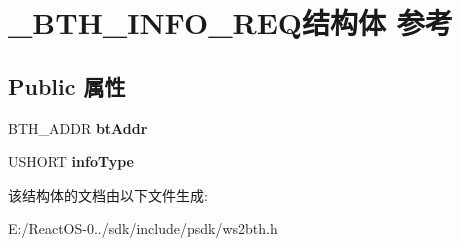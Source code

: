 \hypertarget{struct___b_t_h___i_n_f_o___r_e_q}{}\section{\+\_\+\+B\+T\+H\+\_\+\+I\+N\+F\+O\+\_\+\+R\+E\+Q结构体 参考}
\label{struct___b_t_h___i_n_f_o___r_e_q}
\subsection*{Public 属性}
\begin{DoxyCompactItemize}
\item 
\mbox{\label{struct___b_t_h___i_n_f_o___r_e_q_aac7ae5619b9234c7de256f71ce0d4800}} 
B\+T\+H\+\_\+\+A\+D\+DR {\bfseries bt\+Addr}
\item 
\mbox{\label{struct___b_t_h___i_n_f_o___r_e_q_a42be466cb79c9b41b5e1eb9b068e2944}} 
U\+S\+H\+O\+RT {\bfseries info\+Type}
\end{DoxyCompactItemize}


该结构体的文档由以下文件生成\+:\begin{DoxyCompactItemize}
\item 
E\+:/\+React\+O\+S-\/0../sdk/include/psdk/ws2bth.\+h\end{DoxyCompactItemize}
